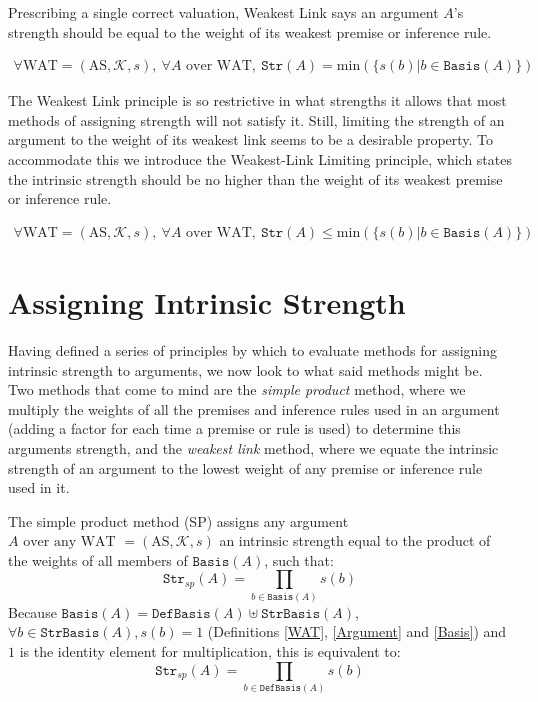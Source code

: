 \documentclass[runningheads]{llncs}
\newcommand{\K}{\mathcal{K}}
\newcommand{\Str}{\texttt{Str}}
\newcommand{\B}{\texttt{Basis}}
\newcommand{\DefB}{\texttt{DefBasis}}
\newcommand{\StrB}{\texttt{StrBasis}}
\begin{document}
Prescribing a single correct valuation, Weakest Link says an argument $A$'s strength should be equal to the weight of its weakest premise or inference rule.
\begin{principle}
\begin{gather*}
    \forall \text{WAT} = ( \text{AS}, \K, s ),\ \forall A \text{ over WAT},\ \Str(A) = \text{min}(\{s(b)| b\in \B(A)\})
\end{gather*}
\end{principle}

The Weakest Link principle is so restrictive in what strengths it allows that most methods of assigning strength will not satisfy it. Still, limiting the strength of an argument to the weight of its weakest link seems to be a desirable property. To accommodate this we introduce the Weakest-Link Limiting principle, which states the intrinsic strength should be no higher than the weight of its weakest premise or inference rule.
\begin{principle}
\begin{gather*}
    \forall \text{WAT} = ( \text{AS}, \K, s ),\ \forall A \text{ over WAT},\ \Str(A) \leq \text{min}(\{s(b)| b\in \B(A)\})
\end{gather*}
\end{principle}
%
\section{Assigning Intrinsic Strength}\label{Assigning_Strength}
Having defined a series of principles by which to evaluate methods for assigning intrinsic strength to arguments, we now look to what said methods might be. Two methods that come to mind are the \textit{simple product} method, where we multiply the weights of all the premises and inference rules used in an argument (adding a factor for each time a premise or rule is used) to determine this arguments strength, and the \textit{weakest link} method, where we equate the intrinsic strength of an argument to the lowest weight of any premise or inference rule used in it.

\begin{definition}\label{SP}
The simple product method (SP) assigns any argument $A \text{ over any WAT } = ( \text{AS}, \K, s )$ an intrinsic strength equal to the product of the weights of all members of $\B(A)$, such that: $$\Str_{sp}(A) = \prod_{b\in\B(A)}s(b)$$
Because $\B(A) = \DefB(A) \uplus \StrB(A)$,  $\forall b \in \StrB(A), s(b) = 1$ (Definitions \ref{WAT}, \ref{Argument} and \ref{Basis}) and $1$ is the identity element for multiplication, this is equivalent to:
$$\Str_{sp}(A) = \prod_{b\in\DefB(A)}s(b)$$
\end{definition}
\end{document}
